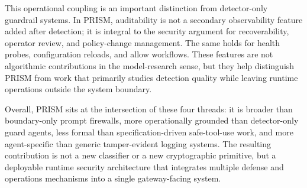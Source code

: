 This operational coupling is an important distinction from detector-only guardrail systems. In PRISM, auditability is not a secondary observability feature added after detection; it is integral to the security argument for recoverability, operator review, and policy-change management. The same holds for health probes, configuration reloads, and allow workflows. These features are not algorithmic contributions in the model-research sense, but they help distinguish PRISM from work that primarily studies detection quality while leaving runtime operations outside the system boundary.

Overall, PRISM sits at the intersection of these four threads: it is broader than boundary-only prompt firewalls, more operationally grounded than detector-only guard agents, less formal than specification-driven safe-tool-use work, and more agent-specific than generic tamper-evident logging systems. The resulting contribution is not a new classifier or a new cryptographic primitive, but a deployable runtime security architecture that integrates multiple defense and operations mechanisms into a single gateway-facing system.
